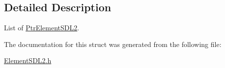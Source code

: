 \subsection{Detailed Description}
List of \hyperlink{structPtrElementSDL2}{Ptr\+Element\+S\+D\+L2}. 

The documentation for this struct was generated from the following file\+:\begin{DoxyCompactItemize}
\item 
\hyperlink{ElementSDL2_8h}{Element\+S\+D\+L2.\+h}\end{DoxyCompactItemize}
